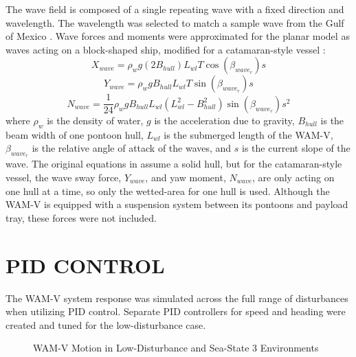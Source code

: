 \documentclass[letterpaper, 10 pt, conference]{ieeeconf}  %
\begin{document}
The wave field is composed of a single repeating wave with a fixed direction and wavelength. The wavelength was selected to match a sample wave from the Gulf of Mexico \cite{Liu:12a}. Wave forces and moments were approximated for the planar model as waves acting on a block-shaped ship, modified for a catamaran-style vessel \cite{Fossen:11c}:
%
\begin{equation}
X_{wave} = \rho_w g \left(2B_{hull}\right)L_{wl}T\cos\left(\beta_{wave_r}\right)s
\end{equation}
\begin{equation}
Y_{wave} = \rho_w g B_{hull}L_{wl}T\sin\left(\beta_{wave_r}\right)s
\end{equation}
\begin{equation}
N_{wave} = \frac{1}{24}\rho_w g B_{hull}L_{wl}\left(L_{wl}^2 - B_{hull}^2\right)\sin\left(\beta_{wave_r}\right)s^2
\end{equation}
%
where $\rho_w$ is the density of water, $g$ is the acceleration due to gravity, $B_{hull}$ is the beam width of one pontoon hull, $L_{wl}$ is the submerged length of the WAM-V, $\beta_{wave_r}$ is the relative angle of attack of the waves, and $s$ is the current slope of the wave. The original equations in \cite{Fossen:11c} assume a solid hull, but for the catamaran-style vessel, the wave sway force, $Y_{wave}$, and yaw moment, $N_{wave}$, are only acting on one hull at a time, so only the wetted-area for one hull is used. Although the WAM-V is equipped with a suspension system between its pontoons and payload tray, these forces were not included.

\section{PID CONTROL}
The WAM-V system response was simulated across the full range of disturbances when utilizing PID control. Separate PID controllers for speed and heading were created and tuned for the low-disturbance case.
%
\begin{figure}[tb]
\begin{center}
\vspace{-0.125in}
\caption{WAM-V Motion in Low-Disturbance and Sea-State 3 Environments}
\label{fig:PlanarPath}
\end{center}
\vspace{-0.2in}
\end{figure}
%
\end{document}
